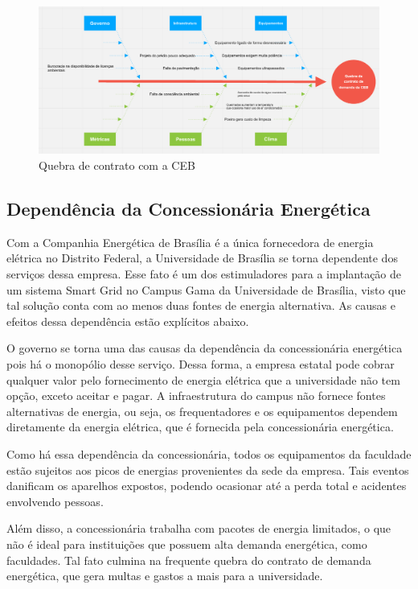 \begin{figure}[!htb]
\centering
\includegraphics[width=0.75\paperwidth]{figuras/Fishbone1.png}
\caption{Quebra de contrato com a CEB}
\end{figure}

\subsection {Dependência da Concessionária Energética}
Com a Companhia Energética de Brasília é a única fornecedora de energia elétrica no Distrito Federal, a Universidade de Brasília se torna dependente dos serviços dessa empresa. Esse fato é um dos estimuladores para a implantação de um sistema Smart Grid no Campus Gama da Universidade de Brasília, visto que tal solução conta com ao menos duas fontes de energia alternativa. As causas e efeitos dessa dependência estão explícitos abaixo. 
\par O governo se torna uma das causas da dependência da concessionária energética pois há o monopólio desse serviço. Dessa forma, a empresa estatal pode cobrar qualquer valor pelo fornecimento de energia elétrica que a universidade não tem opção, exceto aceitar e pagar. 
A infraestrutura do campus não fornece fontes alternativas de energia, ou seja, os frequentadores e os equipamentos dependem diretamente da energia elétrica, que é fornecida pela concessionária energética.
\par Como há essa dependência da concessionária, todos os equipamentos da faculdade estão sujeitos aos picos de energias provenientes da sede da empresa. Tais eventos danificam os aparelhos expostos, podendo ocasionar até a perda total e acidentes envolvendo pessoas.  
\par Além disso, a concessionária trabalha com pacotes de energia limitados, o que não é ideal para instituições que possuem alta demanda energética, como faculdades. Tal fato culmina na frequente quebra do contrato de demanda energética, que gera multas e gastos a mais para a universidade. 
